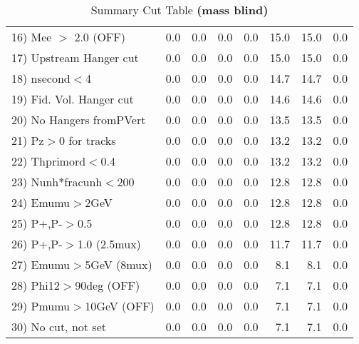 \begin{table}[h!]
{{\begin{tabular}{||l||r|r|r|r|r||r||r||}
 16) Mee $>$ 2.0  (OFF)   &       0.0 &       0.0 &       0.0 &       0.0 &      15.0 &      15.0 &       0.0 \\
 17) Upstream Hanger cut  &       0.0 &       0.0 &       0.0 &       0.0 &      15.0 &      15.0 &       0.0 \\
 18) nsecond$<$4          &       0.0 &       0.0 &       0.0 &       0.0 &      14.7 &      14.7 &       0.0 \\
 19) Fid. Vol. Hanger cut &       0.0 &       0.0 &       0.0 &       0.0 &      14.6 &      14.6 &       0.0 \\
 20) No Hangers fromPVert &       0.0 &       0.0 &       0.0 &       0.0 &      13.5 &      13.5 &       0.0 \\
 21) Pz$>$0 for tracks    &       0.0 &       0.0 &       0.0 &       0.0 &      13.2 &      13.2 &       0.0 \\
 22) Thprimord$<$0.4      &       0.0 &       0.0 &       0.0 &       0.0 &      13.2 &      13.2 &       0.0 \\
 23) Nunh*fracunh$<$200   &       0.0 &       0.0 &       0.0 &       0.0 &      12.8 &      12.8 &       0.0 \\
 24) Emumu$>$2GeV         &       0.0 &       0.0 &       0.0 &       0.0 &      12.8 &      12.8 &       0.0 \\
 25) P+,P-$>$0.5          &       0.0 &       0.0 &       0.0 &       0.0 &      12.8 &      12.8 &       0.0 \\
 26) P+,P-$>$1.0 (2.5mux) &       0.0 &       0.0 &       0.0 &       0.0 &      11.7 &      11.7 &       0.0 \\
 27) Emumu$>$5GeV  (8mux) &       0.0 &       0.0 &       0.0 &       0.0 &       8.1 &       8.1 &       0.0 \\
 28) Phi12$>$90deg  (OFF) &       0.0 &       0.0 &       0.0 &       0.0 &       7.1 &       7.1 &       0.0 \\
 29) Pmumu$>$10GeV  (OFF) &       0.0 &       0.0 &       0.0 &       0.0 &       7.1 &       7.1 &       0.0 \\
 30) No cut, not set      &       0.0 &       0.0 &       0.0 &       0.0 &       7.1 &       7.1 &       0.0 \\
 \hline
 \hline
 \end{tabular}
 \caption{Summary Cut Table \textbf{ (mass blind)}}
 \label{tab-sumcut}
 }}
 \end{table}
 \endinput
